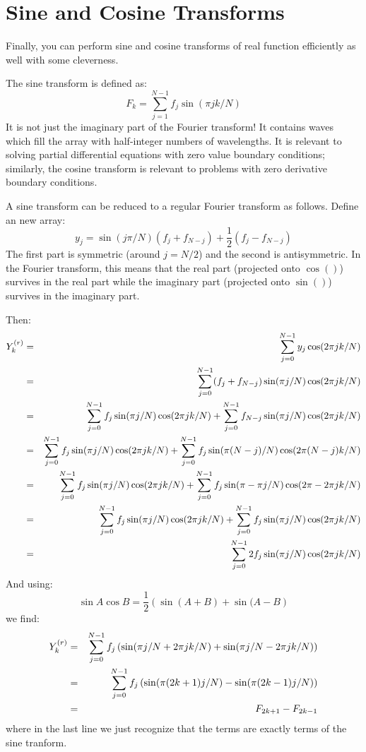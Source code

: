 \section{Sine and Cosine Transforms}

Finally, you can perform sine and cosine transforms of real function
efficiently as well with some cleverness.

The sine transform is defined as:
\begin{equation}
F_k = \sum_{j=1}^{N-1} f_j \sin(\pi jk /N)
\end{equation}
It is not just the imaginary part of the Fourier transform! It
contains waves which fill the array with half-integer numbers of
wavelengths. It is relevant to solving partial differential equations
with zero value boundary conditions; similarly, the cosine transform
is relevant to problems with zero derivative boundary conditions.

A sine transform can be reduced to a regular Fourier transform as
follows. Define an new array:
\begin{equation}
y_j = \sin(j\pi /N) \left(f_j + f_{N-j}\right)
+ \frac{1}{2}\left(f_j - f_{N-j}\right)
\end{equation}
The first part is symmetric (around $j=N/2$) and the  second is
antisymmetric.  In the Fourier transform, this means that the real
part (projected onto $\cos()$) survives in the real part while the
imaginary part (projected onto $\sin()$) survives in the imaginary
part. 

Then:
\begin{eqnarray}
Y^{(r)}_k &=&
\sum_{j=0}^{N-1} y_j \cos(2\pi jk /N) \cr
&=&
\sum_{j=0}^{N-1} (f_j + f_{N-j}) \sin(\pi j / N) \cos(2\pi jk /N) \cr
&=&
\sum_{j=0}^{N-1} f_j \sin(\pi j / N) \cos(2\pi jk /N) 
+ \sum_{j=0}^{N-1} f_{N-j} \sin(\pi j / N) \cos(2\pi jk /N)  \cr
&=&
\sum_{j=0}^{N-1} f_j \sin(\pi j / N) \cos(2\pi jk /N) 
+ \sum_{j=0}^{N-1} f_j \sin(\pi (N - j) / N) \cos(2\pi (N- j) k /N)  \cr
&=&
\sum_{j=0}^{N-1} f_j \sin(\pi j / N) \cos(2\pi jk /N) 
+ \sum_{j=0}^{N-1} f_j \sin(\pi - \pi j / N) \cos(2\pi - 2\pi j k /N)  \cr
&=&
\sum_{j=0}^{N-1} f_j \sin(\pi j / N) \cos(2\pi jk /N) 
+ \sum_{j=0}^{N-1} f_j \sin(\pi j / N) \cos(2\pi j k /N)  \cr
&=&
\sum_{j=0}^{N-1} 2 f_j \sin(\pi j / N) \cos(2\pi jk /N)
\end{eqnarray}
And using:
\begin{equation}
\sin A \cos B = \frac{1}{2}\left(\sin(A+B) + \sin(A-B\right)
\end{equation}
we find:
\begin{eqnarray}
Y^{(r)}_k &=&
\sum_{j=0}^{N-1} f_j \left(\sin(\pi j / N + 2\pi jk /N)
+\sin(\pi j / N - 2\pi jk /N) \right) \cr
&=& 
\sum_{j=0}^{N-1} f_j \left(\sin(\pi (2k+1) j / N)
-\sin(\pi (2k - 1) j / N) \right) \cr
&=& 
F_{2k+1} - F_{2k-1} 
\end{eqnarray}
where in the last line we just recognize that the terms are exactly
terms of the sine tranform.

